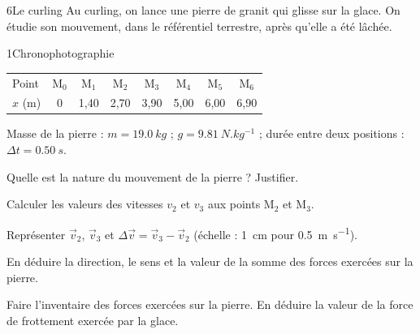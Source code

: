 \begin{exoBac}{6}{Le curling}
Au curling, on lance une pierre de granit qui glisse sur la glace. On étudie son mouvement, dans le référentiel terrestre, après
qu'elle a été lâchée.
\begin{docu}{1}{Chronophotographie}
{\centering\small\begin{tabular}{@{}lccccccc@{}}\toprule
Point & M$_0$ & M$_1$ & M$_2$ & M$_3$ & M$_4$ & M$_5$ & M$_6$ \\
$x$ (m) & 0 & 1,40 & 2,70 & 3,90 & 5,00 & 6,00 & 6,90 \\\bottomrule
\end{tabular}\par}
\end{docu}
\begin{donnees}
Masse de la pierre : $m=\qty{19,0}{kg}$ ; $g=\qty{9,81}{N.kg^{-1}}$ ; durée entre deux positions : $\Delta t=\qty{0,50}{s}$.
\end{donnees}
\begin{questions}
\item Quelle est la nature du mouvement de la pierre ? Justifier.
\item Calculer les valeurs des vitesses $v_2$ et $v_3$ aux points M$_2$ et M$_3$.
\item Représenter $\vec v_2$, $\vec v_3$ et $\Delta\vec v=\vec v_3-\vec v_2$ (échelle : \qty{1}{cm} pour \qty{0,5}{m.s^{-1}}).
\item En déduire la direction, le sens et la valeur de la somme des forces exercées sur la pierre.
\item Faire l'inventaire des forces exercées sur la pierre. En déduire la valeur de la force de frottement exercée par la glace.
\end{questions}
\end{exoBac}
